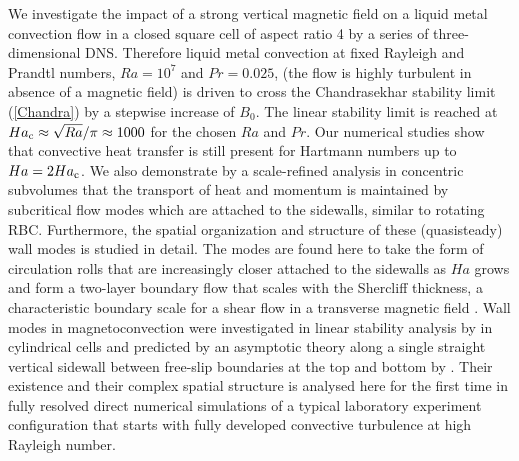 \documentclass{jfm}
\begin{document}
We investigate the impact of a strong vertical magnetic field on a liquid metal convection flow in a closed square cell of
aspect ratio 4 by a series of three-dimensional DNS. Therefore liquid metal convection at 
fixed Rayleigh and Prandtl numbers, $Ra=10^7$ and $Pr=0.025$, (the flow is highly turbulent in absence of a 
magnetic field) is driven to cross the Chandrasekhar stability limit (\ref{Chandra}) by a stepwise increase of $B_0$. The 
linear stability limit is reached at $Ha_{\rm c}\approx\sqrt{Ra}/\pi\approx 1000$ for the chosen $Ra$ and $Pr$. Our numerical studies 
show that convective heat transfer is still present for Hartmann numbers up to $Ha=2 Ha_{\rm c}$. We also demonstrate by a scale-refined 
analysis in concentric subvolumes that the transport of heat 
and momentum is maintained by subcritical flow modes which are attached to the sidewalls, similar to rotating RBC. Furthermore,  
the spatial organization and structure of these (quasisteady) wall modes is studied in detail. The modes are found here to take the form of circulation rolls that are 
increasingly closer attached to the sidewalls as $Ha$ grows and form a two-layer boundary flow that scales with the Shercliff thickness, 
a characteristic boundary scale for a shear flow in a transverse magnetic field \citep{Shercliff1953}. Wall modes in
magnetoconvection were investigated in linear stability analysis by \cite{Houchens2002} in cylindrical cells and predicted by an asymptotic 
theory along a single straight vertical sidewall between free-slip boundaries at the top and bottom by \cite{Busse2008}.     
Their existence and their complex spatial structure is analysed here for the first time in fully resolved direct numerical simulations 
of a typical laboratory experiment configuration that starts with fully developed convective turbulence at high Rayleigh number.
\end{document}
